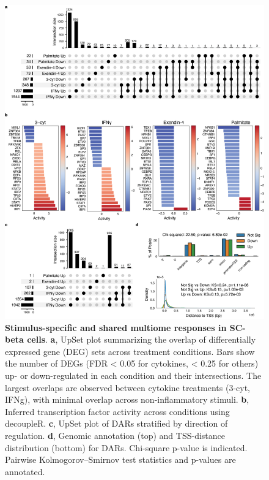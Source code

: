 \begin{figure}[p]
    \centering
    \includegraphics[width=\textwidth]{3_figures-and-files/ExtendedFig3.png}
    \caption[Stimulus-specific and shared SC-beta cell responses]{\textbf{Stimulus-specific and shared multiome responses in SC-beta cells}. \textbf{a}, UpSet plot summarizing the overlap of differentially expressed gene (DEG) sets across treatment conditions. Bars show the number of DEGs (FDR < 0.05 for cytokines, < 0.25 for others) up- or down-regulated in each condition and their intersections. The largest overlaps are observed between cytokine treatments (3-cyt, IFNg), with minimal overlap across non-inflammatory stimuli. \textbf{b}, Inferred transcription factor activity across conditions using decoupleR. \textbf{c}, UpSet plot of DARs stratified by direction of regulation. \textbf{d}, Genomic annotation (top) and TSS-distance distribution (bottom) for DARs. Chi-square p-value is indicated. Pairwise Kolmogorov–Smirnov test statistics and p-values are annotated.}
    \label{fig:3 supplementary_3}
\end{figure}
